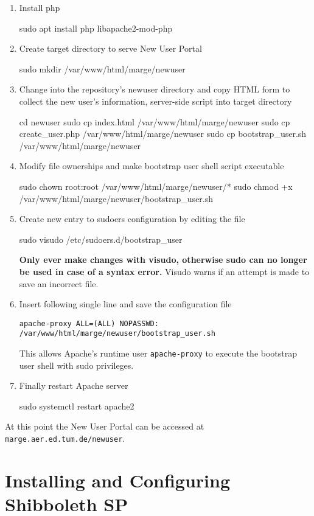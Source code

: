 \begin{enumerate}
    \item Install php 
    \begin{terminal}
        sudo apt install php libapache2-mod-php
    \end{terminal}
    \item Create target directory to serve New User Portal
    \begin{terminal}
        sudo mkdir /var/www/html/marge/newuser
    \end{terminal}
    \item Change into the repository's newuser directory and copy HTML form to
    collect the new user's information, server-side script into target directory
    \begin{terminal}
        cd newuser
        sudo cp index.html /var/www/html/marge/newuser
        sudo cp create_user.php /var/www/html/marge/newuser
        sudo cp bootstrap_user.sh /var/www/html/marge/newuser
    \end{terminal}
    \item Modify file ownerships and make bootstrap user shell script executable
    \begin{terminal}
        sudo chown root:root /var/www/html/marge/newuser/*
        sudo chmod +x /var/www/html/marge/newuser/bootstrap_user.sh
    \end{terminal}
    \item Create new entry to sudoers configuration by editing the file
    \begin{terminal}
        sudo visudo /etc/sudoers.d/bootstrap_user
    \end{terminal}
    \textbf{Only ever make changes with visudo, otherwise sudo can no longer be
    used in case of a syntax error.} Visudo warns if an attempt is made to save
    an incorrect file.
    \item Insert following single line and save the configuration file
    \begin{lstlisting}[frame={l}]
        apache-proxy ALL=(ALL) NOPASSWD: /var/www/html/marge/newuser/bootstrap_user.sh
    \end{lstlisting}
    This allows Apache's runtime user \texttt{apache-proxy} to execute the
    bootstrap user shell with sudo privileges.
    \item Finally restart Apache server
    \begin{terminal}
        sudo systemctl restart apache2
    \end{terminal}
\end{enumerate}

At this point the New User Portal can be accessed at
\texttt{marge.aer.ed.tum.de/newuser}.

\section{Installing and Configuring Shibboleth SP}\label{section:shibboleth}
